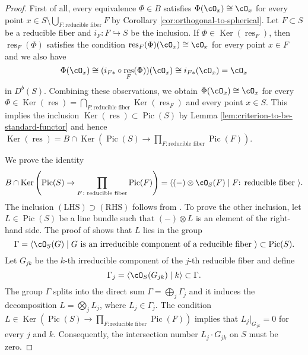 \documentclass{amsart}
\numberwithin{equation}{section}
\theoremstyle{plain}
\theoremstyle{definition}
\DeclareMathOperator{\Pic}{\mathrm{Pic}}
\DeclareMathOperator{\Ker}{\mathrm{Ker}}
\DeclareMathOperator{\res}{\mathrm{res}}
\begin{document}
\begin{proof}
    First of all, every equivalence $\Phi \in B$ satisfies $\Phi(\cO_x) \cong \cO_x$ for every point $x \in S \setminus \bigcup_{F \colon \text{reducible fiber}}F$ by Corollary \ref{cor:orthogonal-to-spherical}.
    Let $F \subset S$ be a reducible fiber and $i_F \colon F \hookrightarrow S$ be the inclusion.
    If $\Phi \in \Ker(\res_F)$, then $\res_F(\Phi)$ satisfies the condition $\res_F(\Phi)(\cO_x) \cong \cO_x$ for every point $x \in F$ and we also have
    \begin{equation}
        \Phi(\cO_x) \cong (i_{F*} \circ \res_F(\Phi))(\cO_x) \cong i_{F*}(\cO_x) = \cO_x
    \end{equation}
    in $D^b(S)$.
    Combining these observations, we obtain $\Phi(\cO_x) \cong \cO_x$ for every $\Phi \in \Ker(\res) = \bigcap_{F \colon \text{reducible fiber}} \Ker(\res_F)$ and every point $x \in S$.
    This implies the inclusion $\Ker(\res) \subset \Pic(S)$ by Lemma \ref{lem:criterion-to-be-standard-functor} and hence $\Ker(\res) = B \cap \Ker \left(\Pic(S) \to \prod_{F \colon \text{reducible fiber}} \Pic(F)\right)$.

    We prove the identity
    \begin{equation}\label{eq:kernel-of-res}
        B \cap \Ker \left(\Pic(S) \to \prod_{F \colon \text{reducible fiber}} \Pic(F)\right) = \langle (-) \otimes \cO_S(F) \mid F \text{: reducible fiber }\rangle.
    \end{equation}
    The inclusion $(\text{LHS}) \supset (\text{RHS})$ follows from \cite[Lemma 4.15 (i)(2)]{MR2198807}.
    To prove the other inclusion, let $L \in \Pic(S)$ be a line bundle such that $(-) \otimes L$ is an element of the right-hand side.
    The proof of \cite[Lemma 4.18 (i)]{MR2198807} shows that $L$ lies in the group
    \begin{equation}
        \Gamma = \langle \cO_S(G) \mid G \text{ is an irreducible component of a reducible fiber }\rangle \subset \Pic(S).
    \end{equation}
    Let $G_{jk}$ be the $k$-th irreducible component of the $j$-th reducible fiber and define
    \begin{equation}
        \Gamma_j = \langle \cO_S(G_{jk}) \mid k  \rangle \subset \Gamma.
    \end{equation}
    The group $\Gamma$ splits into the direct sum $\Gamma = \bigoplus_{j} \Gamma_j$ and it induces the decomposition $L = \bigotimes_{j} L_j$, where $L_j \in \Gamma_j$.
    The condition $L \in \Ker(\Pic(S) \to \prod_{F \colon \text{reducible fiber}} \Pic(F))$ implies that $L_j \lvert_{G_{jk}} = 0$ for every $j$ and $k$.
    Consequently, the intersection number $L_j \cdot G_{jk}$ on $S$ must be zero.


\end{proof}
\end{document}

